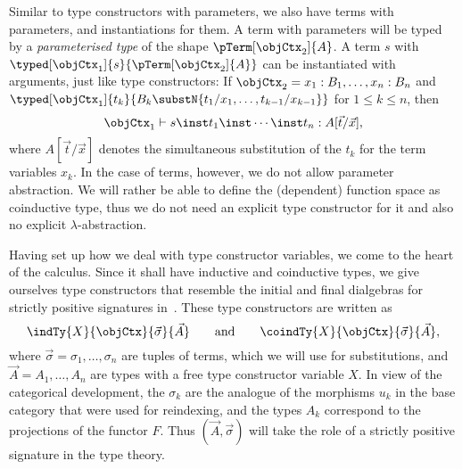 \documentclass[preprint]{sigplanconf}
\begin{document}
Similar to type constructors with parameters, we also have terms with
parameters, and instantiations for them.
A term with parameters will be typed by a \emph{parameterised type} of the
shape $\pTerm[\objCtx_2]{A}$.
A term $s$ with $\typed[\objCtx_1]{s}{\pTerm[\objCtx_2]{A}}$ can be instantiated
with arguments, just like type constructors:
If $\objCtx_2 = x_1 : B_1, \dotsc, x_n : B_n$ and
$\typed[\objCtx_1]{t_k}{B_k \substN{t_1/x_1, \dotsc, t_{k-1}/x_{k-1}}}$ for
$1\leq k \leq n$, then
\begin{equation*}
  \objCtx_1  \vdash s \inst t_1 \inst \dotsb \inst t_n: A[\vec{t}/\vec{x}],
\end{equation*}
where $ A[\vec{t}/\vec{x}]$ denotes the simultaneous substitution of the $t_k$
for the term variables $x_k$.
In the case of terms, however, we do not allow parameter abstraction.
We will rather be able to define the (dependent) function space as
coinductive type, thus we do not need an explicit type constructor for it
and also no explicit $\lambda$-abstraction.

Having set up how we deal with type constructor variables, we come to the heart
of the calculus.
Since it shall have inductive and coinductive types, we give ourselves
type constructors that resemble the initial and final dialgebras for strictly
positive signatures in~.
These type constructors are written as
\begin{equation*}
  \indTy{X}{\objCtx}{\vec{\sigma}}{\vec{A}}
  \qquad \text{and} \qquad
  \coindTy{X}{\objCtx}{\vec{\sigma}}{\vec{A}},
\end{equation*}
where $\vec{\sigma} = \sigma_1, \dotsc, \sigma_n$ are
tuples of terms, which we will use for substitutions, and
$\vec{A} = A_1, \dotsc, A_n$ are types with a free type constructor variable
$X$.
In view of the categorical development, the $\sigma_k$ are the analogue of the
morphisms $u_k$ in the base category that were used for reindexing,
and the types $A_k$ correspond to the projections of the functor $F$.
Thus $(\vec{A}, \vec{\sigma})$ will take the role of a strictly positive
signature in the type theory.
\end{document}
